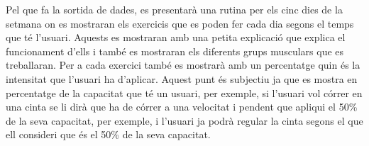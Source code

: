 Pel que fa la sortida de dades, es presentarà una rutina per els cinc dies de la setmana on es mostraran els exercicis que es poden fer cada dia segons el temps que té l'usuari.
Aquests es mostraran amb una petita explicació que explica el funcionament d'ells i també es mostraran els diferents grups musculars que es treballaran.
Per a cada exercici també es mostrarà amb un percentatge quin és la intensitat que l'usuari ha d'aplicar. Aquest punt és subjectiu ja que es mostra en percentatge de la capacitat que té un usuari, per exemple, si l'usuari vol córrer en una cinta se li dirà que ha de córrer a una velocitat i pendent que apliqui el 50\% de la seva capacitat, per exemple, i l'usuari ja podrà regular la cinta segons el que ell consideri que és el 50\% de la seva capacitat.